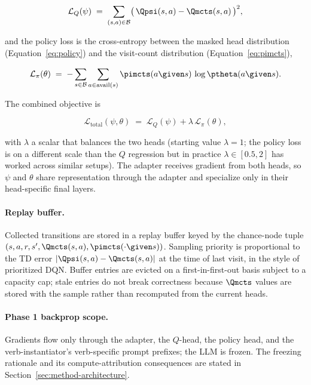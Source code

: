 \begin{equation}
\label{eq:lossq}
\mathcal{L}_Q(\psi)
\;=\;
\sum_{(s, a) \in \mathcal{B}}
\bigl(\, \Qpsi(s, a) - \Qmcts(s, a) \,\bigr)^{2},
\end{equation}

and the policy loss is the cross-entropy between the masked head
distribution (Equation~\ref{eq:policy}) and the visit-count
distribution (Equation~\ref{eq:pimcts}),

\begin{equation}
\label{eq:losspi}
\mathcal{L}_\pi(\theta)
\;=\;
-\sum_{s \in \mathcal{B}} \sum_{a \in \mathrm{avail}(s)}
\pimcts(a \given s)\, \log \ptheta(a \given s).
\end{equation}

The combined objective is

\begin{equation}
\label{eq:losstotal}
\mathcal{L}_{\text{total}}(\psi, \theta)
\;=\;
\mathcal{L}_Q(\psi) + \lambda\, \mathcal{L}_\pi(\theta),
\end{equation}

with $\lambda$ a scalar that balances the two heads (starting value
$\lambda = 1$; the policy loss is on a different scale than the $Q$
regression but in practice $\lambda \in [0.5, 2]$ has worked across
similar setups). The adapter receives gradient from both heads, so
$\psi$ and $\theta$ share representation through the adapter and
specialize only in their head-specific final layers.

\paragraph{Replay buffer.}
Collected transitions are stored in a replay buffer keyed by the
chance-node tuple $(s, a, r, s', \Qmcts(s, a),
\pimcts(\cdot \given s))$. Sampling priority is proportional to the
TD error $|\Qpsi(s, a) - \Qmcts(s, a)|$ at the time of last visit, in
the style of prioritized DQN. Buffer entries are evicted on a
first-in-first-out basis subject to a capacity cap; stale entries do
not break correctness because $\Qmcts$ values are stored with the
sample rather than recomputed from the current heads.

\paragraph{Phase 1 backprop scope.}
Gradients flow only through the adapter, the $Q$-head, the policy
head, and the verb-instantiator's verb-specific prompt prefixes; the
LLM is frozen. The freezing rationale and its compute-attribution
consequences are stated in Section~\ref{sec:method-architecture}.

